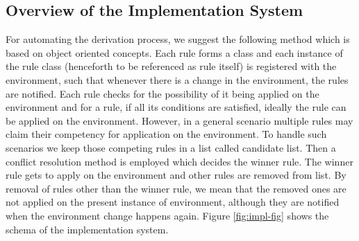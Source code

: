 \documentclass[11pt]{article}
\begin{document}
\subsection{Overview of the Implementation System }
\label{sect:impl}

For automating the derivation process, we suggest the following method
which is based on object oriented concepts. Each rule forms a class and each instance of the rule class (henceforth to be referenced as rule itself) is registered
with the environment, such that whenever there is a change in the environment, the rules are
notified. Each rule checks for the possibility of it being applied on the environment and for a rule, if all its conditions are satisfied, ideally the rule can be applied on the environment. However, in a general scenario multiple rules may claim their competency for application on the environment. To handle such scenarios we keep those competing rules in a list called candidate list. Then a conflict resolution method is employed which decides the winner rule. The winner rule gets to apply on the environment and other rules are removed from list. By removal of rules other than the winner rule, we mean that the removed ones are not applied on the present instance of environment, although they are notified when the environment change happens again. Figure \ref{fig:impl-fig} shows the schema of the implementation system.
\end{document}
